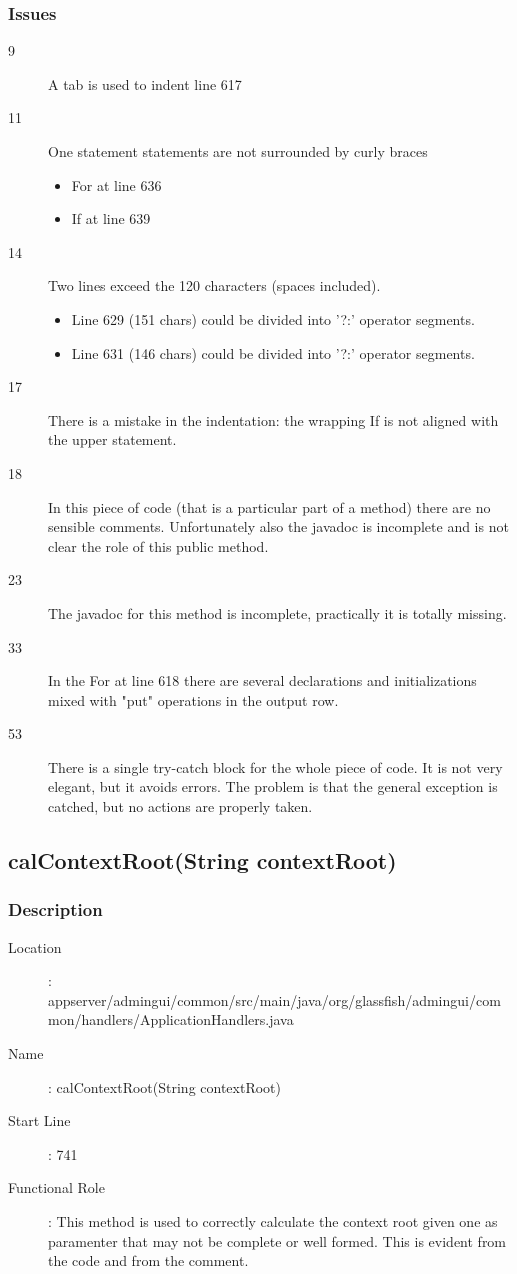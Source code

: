 		\subsubsection{Issues}
		\begin{description}
			\item[9] A tab is used to indent line 617
			\item[11] One statement statements are not surrounded by curly braces
			\begin{itemize}
				\item For at line 636
				\item If at line 639
			\end{itemize}
			\item[14] Two lines exceed the 120 characters (spaces included).
			\begin{itemize}
				\item Line 629 (151 chars) could be divided into '?:' operator segments.
				\item Line 631 (146 chars) could be divided into '?:' operator segments.
			\end{itemize}
			\item[17] There is a mistake in the indentation: the wrapping If is not aligned with the upper statement.
			\item[18] In this piece of code (that is a particular part of a method) there are no sensible comments.
			Unfortunately also the javadoc is incomplete and is not clear the role of this public method.
			\item[23] The javadoc for this method is incomplete, practically it is totally missing.
			\item[33] In the For at line 618 there are several declarations and initializations mixed with "put"
			operations in the output row.
			\item[53] There is a single try-catch block for the whole piece of code. It is not very elegant, but
			it avoids errors. The problem is that the general exception is catched, but no actions are properly taken.
		\end{description}
		\subsection{calContextRoot(String contextRoot)}
			\subsubsection{Description}
			\begin{description}
			\item[Location]: appserver/admingui/common/src/main/java/org/glassfish/admingui/common/handlers/ApplicationHandlers.java
			\item[Name]: calContextRoot(String contextRoot)
			\item[Start Line]: 741
			\item[Functional Role]: This method is used to correctly calculate the context root given one as paramenter that may not be complete or well formed. This is evident
			from the code and from the comment.
			\end{description}
			\newpage
